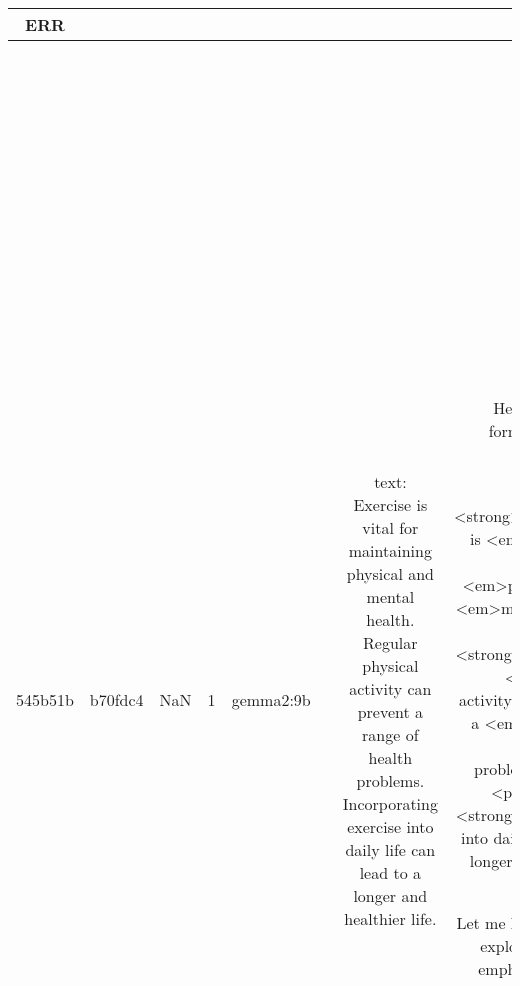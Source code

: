 \begin{table}[h!]
\begin{tabular}{|c|c|c|c|c|c|c|c|c|c|}
ERR\\
\hline
545b51b & b70fdc4 & NaN & 1 & gemma2:9b &  & text: Exercise is vital for maintaining physical and mental health. Regular physical activity can prevent a range of health problems. Incorporating exercise into daily life can lead to a longer and healthier life. & Here's the HTML formatting for that paragraph:

<p><strong>Exercise</strong> is <em>vital</em> for maintaining <em>physical</em> and <em>mental</em> health.</p>
<p><strong>Regular</strong> <em>physical activity</em> can prevent a <em>range</em> of <em>health problems</em>.</p>
<p>Incorporating <strong>exercise</strong> into daily life can lead to a longer and healthier life.</p> 


Let me know if you'd like to explore other ways to emphasize text within HTML! & ok & The output includes three sentences, each wrapped in a `<p>` tag, satisfying the requirement for at least three `<p>` tags. Each `<p>` tag contains at least one `<strong>` tag, complying with the requirement to emphasize key words and phrases using `<strong>`. Additionally, multiple `<em>` tags are used within each `<p>` tag to emphasize different keywords and phrases, which aligns with the requirement to include multiple `<em>` tags. There are no issues with the output based on the given description, as all criteria that can be checked without the input are met.

No violation.
OK\\
\hline
4c3df8f & b70fdc4 & NaN & 1 & gemma2:9b &  & text: The library was founded in 1920. It has a vast collection of books and historical documents. Many students and researchers visit the library to gather valuable information for their projects. & <p><strong>The</strong> library was <em>founded</em> in <em>1920</em>.</p>
<p>It has a <em>vast collection</em> of <em>books</em> and <em>historical documents</em>.</p>
<p><strong>Many</strong> <em>students</em> and <em>researchers</em> visit the library to gather <em>valuable information</em> for their <em  projects>projects</em>.</p>


 & err & The chatbot's output does not comply with the description due to the following reasons:

1. The output contains at least three <p> tags, which meets the requirement for the number of paragraphs. This complies with the description.
2. Each sentence within a <p> tag is wrapped properly, which aligns with formatting requirements.
3. There is an inclusion of <strong> tags in the output, which meets the requirement for having a <strong> tag inside each <p> tag.
4. The output includes multiple <em> tags to emphasize key words and phrases, which complies with the description.
5. However, there is a syntax error in the last <em> HTML tag. The opening tag <em projects> should be written as <em> instead to correctly emphasize the word "projects".


\end{tabular}
\end{table}
